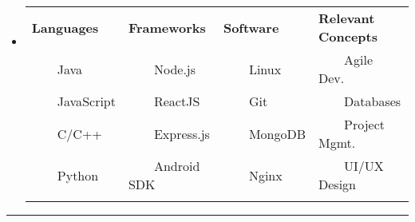 \documentclass[10pt,a4paper]{article}
\newcommand{\tabitem}{~~\llap{--}~~}
\newenvironment{indentsection}[1]%
{\begin{list}{}%
	{\setlength{\leftmargin}{1.7#1}}%
	\item[]%
}
{\end{list}}
\begin{document}
\begin{itemize}[leftmargin=*]
	\parskip=0.1em	

\item[]

\begin{tabularx}{\textwidth}{X X X X}

\textbf{Languages} & \textbf{Frameworks} & \textbf{Software} & \textbf{Relevant Concepts}\\
\tabitem Java & \tabitem Node.js & \tabitem Linux & \tabitem Agile Dev.\\
\tabitem JavaScript & \tabitem ReactJS  & \tabitem Git & \tabitem Databases\\	
\tabitem C/C++ & \tabitem Express.js  & \tabitem MongoDB & \tabitem Project Mgmt.\\
\tabitem Python & \tabitem Android SDK & \tabitem Nginx & \tabitem UI/UX Design\\
\\




\end{tabularx}

\end{itemize}



\vspace{-1.1em}
\hrule %
\vspace{-0.4em}
\end{document}
